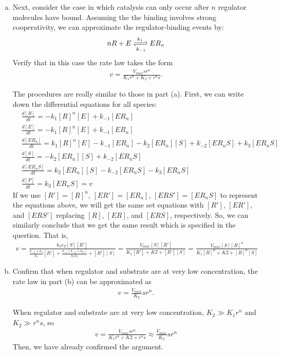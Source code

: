 \documentclass[paper=a4, fontsize=11pt]{scrartcl} %
\numberwithin{equation}{section} %
\numberwithin{figure}{section} %
\numberwithin{table}{section} %
\begin{document}
\begin{enumerate}[a)]
		\item Next, consider the case in which catalysis can only occur after $n$ regulator molecules have bound. Assuming the the binding involves strong cooperativity, we can approximate the regulator-binding events by:
		\begin{gather*}
			nR + E \xrightleftharpoons[k_{-1}]{k_1} ER_n
		\end{gather*}
		Verify that in this case the rate law takes the form
		\begin{gather*}
			v=\frac{V_{max}sr^n}{K_1r^n+K_2+r^ns}.
		\end{gather*}

		The procedures are really similar to those in part (a).
		First, we can write down the differential equations for all species:
		\begin{align*}
			&\frac{d[R]}{dt}=-k_1[R]^n[E]+k_{-1}[ER_n]\\
			&\frac{d[E]}{dt}=-k_1[R]^n[E]+k_{-1}[ER_n]\\
			&\frac{d[ER_n]}{dt}=k_1[R]^n[E]-k_{-1}[ER_n]-k_2[ER_n][S]+k_{-2}[ER_nS]+k_3[ER_nS]\\
			&\frac{d[S]}{dt}=-k_2[ER_n][S]+k_{-2}[ER_nS]\\
			&\frac{d[ER_nS]}{dt}=k_2[ER_n][S]-k_{-2}[ER_nS]-k_3[ER_nS]\\
			&\frac{d[P]}{dt}=k_3[ER_nS]=v
		\end{align*}
		If we use $[R']=[R]^n$, $[ER']=[ER_n]$, $[ERS']=[ER_nS]$ to represent the equations above, we will get the same set equations with $[R']$, $[ER']$, and $[ERS']$ replacing $[R]$, $[ER]$, and $[ERS]$, respectively. So, we can similarly conclude that we get the same result which is specified in the question. That is,
		\begin{align*}
			v=\frac{k_3e_T[S][R']}{\frac{k_{-2}+k_3}{k_2}[R']+\frac{k_{-1}(k_{-2}+k_3)}{k_1k_2}+[R'][S]}=\frac{V_{max}[S][R']}{K_1[R']+K2+[R'][S]}=\frac{V_{max}[S][R]^n}{K_1[R]^n+K2+[R]^n[S]}
		\end{align*}

		\item  Confirm that when regulator and substrate are at very low concentration, the rate law in part (b) can be approximated as
		\begin{gather*}
			v=\frac{V_{max}}{K_2}sr^n.
		\end{gather*}

		When regulator and substrate are at very low concentration, $K_2\gg K_1r^n$ and $K_2\gg r^ns$, so
		\begin{gather*}
			v=\frac{V_{max}sr^n}{K_1r^n+K2+r^ns}\approx\frac{V_{max}}{K_2}sr^n
		\end{gather*}
		Then, we have already confirmed the argument.

	\end{enumerate}
\end{document}
